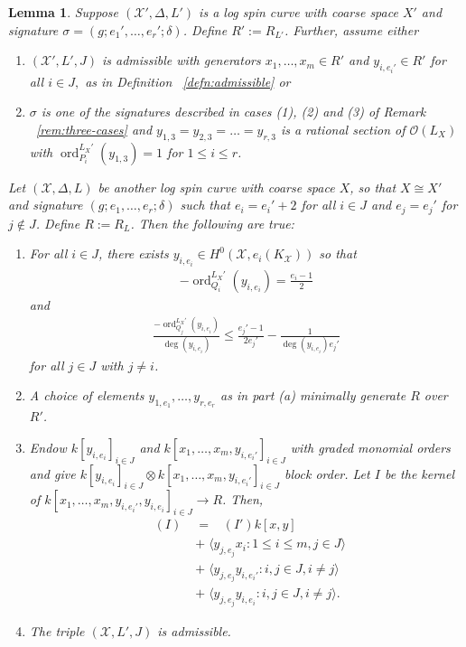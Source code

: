 \documentclass{amsart}
\theoremstyle{plain}
\newtheorem{lem}[thm]{Lemma}
\theoremstyle{definition}
\theoremstyle{remark}
\numberwithin{equation}{section}
\newcommand \sx{\mathscr X}
\newcommand\sco{{\mathscr O}}
\DeclareMathOperator{\ord}{ord}
\newcommand \subhalf[1]{\frac{{#1} - 1}{2{#1}}}
\newcommand{\halfcan}{L}
\DeclareMathOperator{\initial}{in_\prec}
\begin{document}
\begin{lem}
\label{lem:raise-stacky-order}
Suppose $(\sx', \Delta, \halfcan')$ is a log spin curve with coarse
space $X'$ and signature $\sigma = (g; e_1', \ldots, e_r'; \delta)$.  Define $R':= R_{L'}$.  Further, assume either 
\begin{enumerate}
	\item  $(\sx',\halfcan', J)$ is admissible with generators $x_1,\ldots, x_m \in R'$ and $y_{i, e_i'} \in R' $ for all $i \in J,$ as in Definition ~\ref{defn:admissible} or
	\item $\sigma$ is one of the signatures described in cases (1), (2) and (3) of Remark ~\ref{rem:three-cases} and $y_{1, 3} = y_{2,3} = \ldots= y_{r,3}$ is a rational section of $\sco(\halfcan_X)$ with $\ord_{P_i}^{\halfcan_X'}(y_{1,3}) = 1$ for $1 \leq  i \leq r$.
\end{enumerate}
Let
$(\sx, \Delta, \halfcan)$ be another log spin curve
with coarse space $X$, so that $X \cong X'$ and signature $(g; e_1, \ldots, e_r;
\delta)$ such that $e_i = e_i' + 2$ for all $i \in J$ and
$e_j = e_j'$ for $j \notin J$. Define $R := R_L$.  Then the following are true:
\begin{enumerate}
	\item[(a)] For all $i \in J$, there exists $y_{i, e_i} \in
		H^0(\sx, e_i(K_\sx))$ so that
		\begin{align*}
			-\ord_{Q_i}
^{\halfcan_X'}(y_{i, e_i}) = \frac{e_i - 1}{2}
		\end{align*}
		and
		\begin{align*}
			\frac{-\ord_{Q_j}
^{\halfcan_X'}(y_{i, e_i})}{\deg (y_{i, e_i})} \leq 
\subhalf{
			e_j'} - \frac{1}{\deg(y_{i, e_i})e_j'}
		\end{align*}
		for all $j \in J$ with $j \neq i$.
	\item[(b)] 
		A choice of elements $y_{1, e_1}, \ldots, y_{r, e_r}$ as in part (a) minimally
		generate $R$ over $R'$.
	\item[(c)] Endow $k[y_{i, e_i}]_{i\in J}$ and $ k[x_1,\ldots, x_m, y_{i, e_i'}]_{i\in J}$ with graded monomial orders and give 
$k[y_{i, e_i}]_{i\in J} \otimes k[x_1, \ldots, x_m, y_{i, e_i'}]_{i\in J}$
 block order.  Let $I$ be the kernel of $k[x_1, \ldots, x_m, y_{i, e_i'}, y_{i, e_i}]_{i\in J} \to R$.
  Then,
		\begin{align*}
			\initial(I) \;	&= \; \initial(I')k[x, y] \\
					&+ \; \langle y_{j, e_j}x_i  : 1\le i \le m, j\in J\rangle \\
					&+ \; \langle y_{j, e_j}y_{i, e_i'}: i,j\in J, i\ne j\rangle \\
					&+ \; \langle y_{j,e_j}y_{i,e_i}: i,j\in J, i\ne j\rangle.
		\end{align*}
	\item[(d)] The triple $(\sx, \halfcan', J)$ is admissible.
\end{enumerate}
\end{lem}
\end{document}
